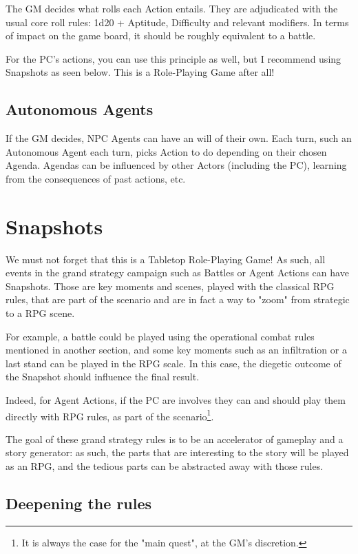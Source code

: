 The GM decides what rolls each Action entails. They are adjudicated with the usual core roll rules: 1d20 + Aptitude, Difficulty and relevant modifiers. In terms of impact on the game board, it should be roughly equivalent to a battle.

For the PC's actions, you can use this principle as well, but I recommend using Snapshots as seen below. This is a Role-Playing Game after all!


\subsection{Autonomous Agents}

If the GM decides, NPC Agents can have an will of their own. Each turn, such an Autonomous Agent each turn, picks Action to do depending on their chosen Agenda. Agendas can be influenced by other Actors (including the PC), learning from the consequences of past actions, etc.



\section{Snapshots}

We must not forget that this is a Tabletop Role-Playing Game! As such, all events in the grand strategy campaign such as Battles or Agent Actions can have Snapshots. Those are key moments and scenes, played with the classical RPG rules, that are part of the scenario and are in fact a way to "zoom" from strategic to a RPG scene.

For example, a battle could be played using the operational combat rules mentioned in another section, and some key moments such as an infiltration or a last stand can be played in the RPG scale. In this case, the diegetic outcome of the Snapshot should influence the final result.

Indeed, for Agent Actions, if the PC are involves they can and should play them directly with RPG rules, as part of the scenario\footnote{It is always the case for the "main quest", at the GM's discretion.}.

The goal of these grand strategy rules is to be an accelerator of gameplay and a story generator: as such, the parts that are interesting to the story will be played as an RPG, and the tedious parts can be abstracted away with those rules.


\subsection{Deepening the rules}

